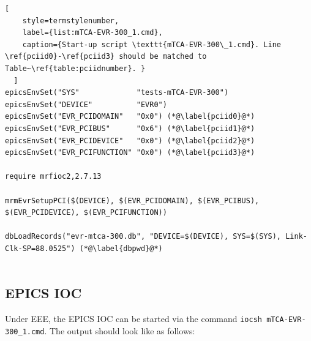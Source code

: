 \documentclass[11pt
  , a4paper
  , article
  , oneside
  , showtrims
]{memoir}
\begin{document}
\begin{lstlisting}[
    style=termstylenumber,
    label={list:mTCA-EVR-300_1.cmd},
    caption={Start-up script \texttt{mTCA-EVR-300\_1.cmd}. Line \ref{pciid0}-\ref{pciid3} should be matched to Table~\ref{table:pciidnumber}. }
  ]
epicsEnvSet("SYS"             "tests-mTCA-EVR-300")
epicsEnvSet("DEVICE"          "EVR0")
epicsEnvSet("EVR_PCIDOMAIN"   "0x0") (*@\label{pciid0}@*)
epicsEnvSet("EVR_PCIBUS"      "0x6") (*@\label{pciid1}@*)
epicsEnvSet("EVR_PCIDEVICE"   "0x0") (*@\label{pciid2}@*)
epicsEnvSet("EVR_PCIFUNCTION" "0x0") (*@\label{pciid3}@*)

require mrfioc2,2.7.13

mrmEvrSetupPCI($(DEVICE), $(EVR_PCIDOMAIN), $(EVR_PCIBUS), $(EVR_PCIDEVICE), $(EVR_PCIFUNCTION))

dbLoadRecords("evr-mtca-300.db", "DEVICE=$(DEVICE), SYS=$(SYS), Link-Clk-SP=88.0525") (*@\label{dbpwd}@*)
  
\end{lstlisting}

\subsection{EPICS IOC}
Under EEE, the EPICS IOC can be started via the command \texttt{iocsh mTCA-EVR-300\_1.cmd}. The output should look like as follows:
\end{document}
